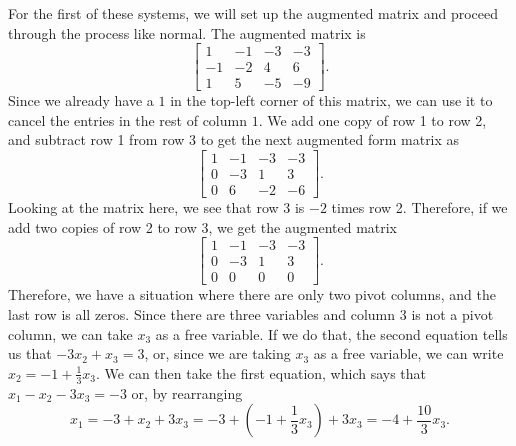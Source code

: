 \documentclass{ximera}
\begin{document}
\begin{exampleSol}
    For the first of these systems, we will set up the augmented matrix and proceed through the process like normal. The augmented matrix is
    \begin{equation*}
        \left[ 
            \begin{array}{ccc|c}
                1 & -1 & -3 & -3 \\
                -1 & -2 & 4 & 6 \\
                1 & 5 & -5 & -9
            \end{array}
        \right].
    \end{equation*}
    Since we already have a $1$ in the top-left corner of this matrix, we can use it to cancel the entries in the rest of column $1$.  We add one copy of row 1 to row 2, and subtract row 1 from row 3 to get the next augmented form matrix as
    \begin{equation*}
        \left[ 
            \begin{array}{ccc|c}
                1 & -1 & -3 & -3 \\
                0 & -3 & 1 & 3 \\
                0 & 6 & -2 & -6
            \end{array}
        \right].
    \end{equation*}
    Looking at the matrix here, we see that row 3 is $-2$ times row 2. Therefore, if we add two copies of row 2 to row 3, we get the augmented matrix
    \begin{equation*}
        \left[ 
            \begin{array}{ccc|c}
                1 & -1 & -3 & -3 \\
                0 & -3 & 1 & 3 \\
                0 & 0 & 0 & 0
            \end{array}
        \right].
    \end{equation*}
    Therefore, we have a situation where there are only two pivot columns, and the last row is all zeros. Since there are three variables and column 3 is not a pivot column, we can take $x_3$ as a free variable. If we do that, the second equation tells us that $-3x_2 + x_3 = 3$, or, since we are taking $x_3$ as a free variable, we can write $x_2 = -1 + \frac{1}{3}x_3$. We can then take the first equation, which says that $x_1 - x_2 - 3x_3 = -3$ or, by rearranging
    \begin{equation*}
        x_1 = -3 + x_2 + 3x_3 = -3 + \left(-1 + \frac{1}{3}x_3\right) + 3x_3 = -4 + \frac{10}{3}x_3.

\end{equation*}
\end{exampleSol}
\end{document}
